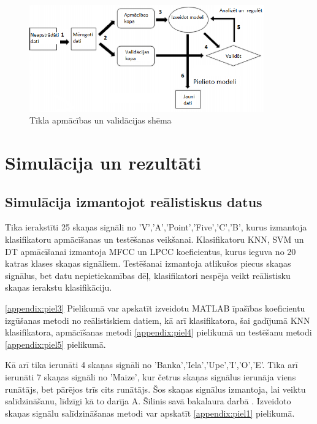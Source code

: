 \documentclass[12pt,paper=A4]{report}
\begin{document}
 
\begin{figure}[H] \centering
\includegraphics[width=0.90\textwidth]{validation} 
\caption{Tīkla apmācības un validācijas shēma \cite{dtw18}}  \label{valid2} 
\end{figure}

\chapter{Simulācija un rezultāti}

\section{Simulācija izmantojot reālistiskus datus}
 \sloppy
Tika ierakstīti 25 skaņas signāli no 'V','A','Point','Five','C','B', kurus izmantoja klasifikatoru apmācīšanas un testēšanas veikšanai. Klasifikatoru KNN, SVM un DT apmācīšanai izmantoja MFCC un LPCC koeficientus, kurus ieguva no 20 katras klases skaņas signāliem. Testēšanai izmantoja atlikušos piecus skaņas signālus, bet datu nepietiekamības dēļ, klasifikatori nespēja veikt reālistisku skaņas ierakstu klasifikāciju. 

\ref{appendix:piel3} Pielikumā var apskatīt izveidotu MATLAB īpašības koeficientu izgūšanas metodi no reālistiskiem datiem, kā arī klasifikatora, šai gadījumā KNN klasifikatora, apmācīšanas metodi \ref{appendix:piel4} pielikumā un testēšanu metodi \ref{appendix:piel5} pielikumā. 

Kā arī tika ierunāti 4 skaņas signāli no 'Banka','Iela','Upe','I','O','E'. Tika arī ierunāti 7 skaņas signāli no 'Maize', kur četrus skaņas signālus ierunāja viens runātājs, bet pārējos trīs cits runātājs. Šos skaņas signālus izmantoja, lai veiktu salīdzināšanu, līdzīgi kā to darīja A. Šilinis savā bakalaura darbā \cite{Pacienta-runas-kvalitātes-noteikšanas-automatizētas-sistēmas-izstrāde}. Izveidoto skaņas signālu salīdzināšanas metodi var apskatīt \ref{appendix:piel1} pielikumā. 
\end{document}
